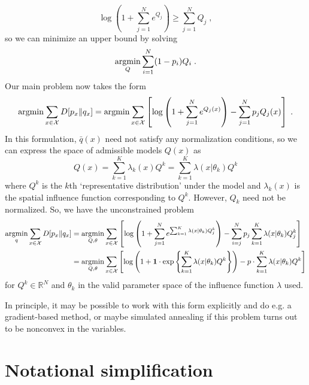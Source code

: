 \documentclass[english]{scrartcl}
\newcommand\R[0]{\mathbb{R}}
\newcommand{\argmin}{\operatornamewithlimits{argmin}}
\begin{document}
		\begin{equation}
			\log\left(1 + \sum_{j = 1}^N e^{Q_j}\right) \geq \sum_{j=1}^N Q_j\;,
		\end{equation}
		so we can minimize an upper bound by solving
		\begin{equation}
			\argmin_{Q} \sum_{i=1}^N(1-p_i)Q_i\;.
		\end{equation}
		Our main problem now takes the form
		\begin{equation}
			\argmin \sum_{x\in \mathcal{X}} D[p_x\|q_x] = \argmin \sum_{x\in\mathcal{X}} \left[\log \left(1 + \sum_{j = 1}^N e^{Q_j(x)}\right)  - \sum_{j=1}^N p_j Q_j(x)\right]\;.
		\end{equation}
		In this formulation, $\bar{q}(x)$ need not satisfy any normalization conditions, so we can express the space of admissible models $Q(x)$ as
		\begin{equation}
			Q(x) = \sum_{k = 1}^K \lambda_k(x)Q^k = \sum_{k = 1}^K \lambda(x|\theta_k)Q^k
		\end{equation}
		where $Q^k$ is the $k$th `representative distribution' under the model and $\lambda_k(x)$ is the spatial influence function corresponding to $Q^k$. However, $Q_k$ need not be normalized. So, we have the unconstrained problem
		\begin{align}
			\argmin_{q} \sum_{x\in \mathcal{X}} D[p_x\|q_x] &= \argmin_{Q,\theta} \sum_{x\in\mathcal{X}} \left[\log \left(1 + \sum_{j = 1}^N e^{\sum_{k = 1}^K \lambda(x|\theta_k)Q_j^k}\right)  - \sum_{i=j}^N p_j \sum_{k = 1}^K \lambda(x|\theta_k)Q_j^k\right] \\
			&= \argmin_{Q,\theta} \sum_{x\in\mathcal{X}} \left[\log \left(1 + \mathbf{1} \cdot \exp \left\{ \sum_{k=1}^K \lambda(x|\theta_k)Q^k \right\}\right) - p\cdot \sum_{k=1}^K \lambda(x|\theta_k)Q^k \right]
		\end{align}
		for $Q^k \in \R^{N}$ and $\theta_k$ in the valid parameter space of the influence function $\lambda$ used.

		In principle, it may be possible to work with this form explicitly and do e.g. a gradient-based method, or maybe simulated annealing if this problem turns out to be nonconvex in the variables.

\section{Notational simplification}
\end{document}
